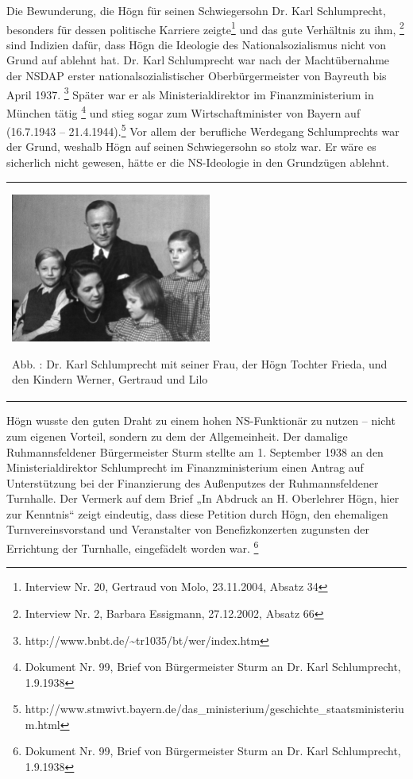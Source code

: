 \documentclass[a4paper]{article}
\newcounter{Abb}
\renewcommand\theAbb{\arabic{Abb}}
\begin{document}
Die Bewunderung, die Högn für seinen Schwiegersohn Dr. Karl
Schlumprecht, besonders für dessen politische Karriere zeigte\footnote{
Interview Nr. 20, Gertraud von Molo, 23.11.2004, Absatz 34} und das
gute Verhältnis zu ihm, \footnote{Interview Nr. 2, Barbara Essigmann,
27.12.2002, Absatz 66} sind Indizien dafür, dass Högn die Ideologie des
Nationalsozialismus nicht von Grund auf ablehnt hat. Dr. Karl
Schlumprecht war nach der Machtübernahme der NSDAP erster
nationalsozialistischer Oberbürgermeister von Bayreuth bis April
1937. \footnote{http://www.bnbt.de/\~{}tr1035/bt/wer/index.htm} Später
war er als Ministerialdirektor im Finanzministerium in München
tätig \footnote{Dokument Nr. 99, Brief von Bürgermeister Sturm an Dr.
Karl Schlumprecht, 1.9.1938} und stieg sogar zum Wirtschaftminister von
Bayern auf (16.7.1943 – 21.4.1944).\footnote{
http://www.stmwivt.bayern.de/das\_ministerium/geschichte\_staatsministerium.html}
Vor allem der berufliche Werdegang Schlumprechts war der Grund, weshalb
Högn auf seinen Schwiegersohn so stolz war. Er wäre es sicherlich nicht
gewesen, hätte er die NS-Ideologie in den Grundzügen ablehnt.

\begin{center}
\begin{minipage}{6.969cm}
\begin{flushleft}
\tablefirsthead{}
\tablehead{}
\tabletail{}
\tablelasttail{}
\begin{supertabular}{m{6.769cm}}

\includegraphics[width=6.588cm,height=4.888cm]{pictures/zulassungsarbeit-img034.jpg}

Abb. \stepcounter{Abb}{\theAbb}: Dr. Karl Schlumprecht mit seiner Frau,
der Högn Tochter Frieda, und den Kindern Werner, Gertraud und Lilo\\
\end{supertabular}
\end{flushleft}
\end{minipage}
\end{center}
Högn wusste den guten Draht zu einem hohen NS-Funktionär zu nutzen –
nicht zum eigenen Vorteil, sondern zu dem der Allgemeinheit. Der
damalige Ruhmannsfeldener Bürgermeister Sturm stellte am 1. September
1938 an den Ministerialdirektor Schlumprecht im Finanzministerium einen
Antrag auf Unterstützung bei der Finanzierung des Außenputzes der
Ruhmannsfeldener Turnhalle. Der Vermerk auf dem Brief „In Abdruck an H.
Oberlehrer Högn, hier zur Kenntnis“ zeigt eindeutig, dass diese
Petition durch Högn, den ehemaligen Turnvereinsvorstand und
Veranstalter von Benefizkonzerten zugunsten der Errichtung der
Turnhalle, eingefädelt worden war. \footnote{Dokument Nr. 99, Brief von
Bürgermeister Sturm an Dr. Karl Schlumprecht, 1.9.1938}
\end{document}
